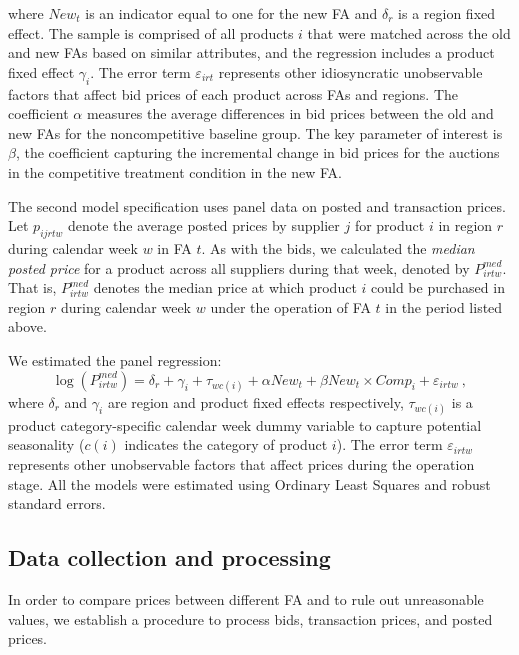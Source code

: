 \noindent where $New_t$ is an indicator equal to one for the new FA and $\delta_r$ is a region fixed effect. The sample is comprised of all products $i$ that were matched across the old and new FAs based on similar attributes, and the regression includes a product fixed effect $\gamma_i$. {The error term $\varepsilon_{irt}$ represents other idiosyncratic unobservable factors that affect bid prices of each product across FAs and  regions.} The coefficient $\alpha$ measures the average differences in bid prices between the old and new FAs for the noncompetitive baseline group. The key parameter of interest is $\beta$, the coefficient capturing the incremental change in bid prices for the auctions in the competitive treatment condition in the new FA.

The second model specification uses panel data on posted and transaction prices. Let $p_{ijrtw}$ denote the average posted prices by supplier $j$ for product $i$ in region $r$ during calendar week $w$ in FA $t$. As with the bids, we calculated the {\em median posted price} for a product across all suppliers during that week, denoted by $P^{med}_{irtw}$. That is, $P^{med}_{irtw}$ denotes the median price at which product $i$ could be purchased in region $r$ during calendar week $w$ under the operation of FA $t$ in the period listed above. 

We estimated the panel regression:
\begin{equation}
    \log (P^{med}_{irtw})= \delta_r + \gamma_i + \tau_{wc(i)} + \alpha New_{t} + \beta New_{t}\times Comp_{i} + \varepsilon_{irtw} \ ,
    \label{eq:reg_op_posted}
\end{equation}
\noindent where $\delta_r$ and $\gamma_i$ are region and product fixed effects respectively, $\tau_{wc(i)}$ is a product category-specific calendar week dummy variable to capture potential seasonality ($c(i)$ indicates the category of product $i$). {The error term $\varepsilon_{irtw}$ represents other unobservable factors that affect prices during the operation stage.} All the models were estimated using Ordinary Least Squares and robust standard errors. 

\subsection{Data collection and processing}
In order to compare prices between different FA and to rule out unreasonable values, we establish a procedure to process bids, transaction prices, and posted prices.

